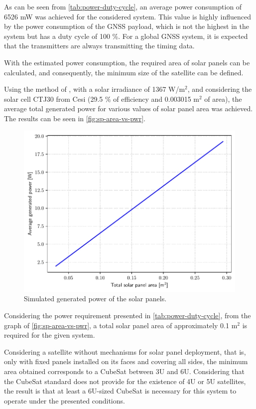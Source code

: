 As can be seen from \autoref{tab:power-duty-cycle}, an average power consumption of 6526 mW was achieved for the considered system. This value is highly influenced by the power consumption of the GNSS payload, which is not the highest in the system but has a duty cycle of 100 \%. For a global GNSS system, it is expected that the transmitters are always transmitting the timing data.

With the estimated power consumption, the required area of solar panels can be calculated, and consequently, the minimum size of the satellite can be defined.

Using the method of \cite{rigo2023}, with a solar irradiance of 1367 W/m$^{2}$, and considering the solar cell CTJ30 from Cesi \cite{ctj30} (29.5 \% of efficiency and 0.003015 m$^{2}$ of area), the average total generated power for various values of solar panel area was achieved. The results can be seen in \autoref{fig:sp-area-vs-pwr}.

\begin{figure}[!ht]
    \begin{center}
        \includegraphics[width=0.8\columnwidth]{curves/sp-area-vs-pwr.pdf}
        \caption{Simulated generated power of the solar panels.}
        \label{fig:sp-area-vs-pwr}
    \end{center}
\end{figure}

Considering the power requirement presented in \autoref{tab:power-duty-cycle}, from the graph of \autoref{fig:sp-area-vs-pwr}, a total solar panel area of approximately 0.1 m$^{2}$ is required for the given system.

Considering a satellite without mechanisms for solar panel deployment, that is, only with fixed panels installed on its faces and covering all sides, the minimum area obtained corresponds to a CubeSat between 3U and 6U. Considering that the CubeSat standard does not provide for the existence of 4U or 5U satellites, the result is that at least a 6U-sized CubeSat is necessary for this system to operate under the presented conditions.

